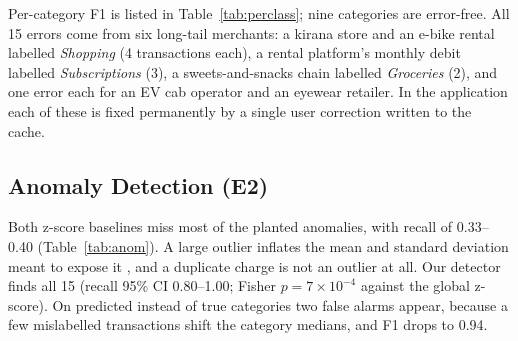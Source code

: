 \documentclass[conference]{IEEEtran}
\begin{document}
\begin{table}[t]
\caption{E1: Transaction categorisation (535 txns, 15 classes)}
\label{tab:cat}
\centering
{}
\end{table}

Per-category F1 is listed in Table~\ref{tab:perclass}; nine categories are error-free. All 15 errors come from six long-tail merchants: a kirana store and an e-bike rental labelled \emph{Shopping} (4 transactions each), a rental platform's monthly debit labelled \emph{Subscriptions} (3), a sweets-and-snacks chain labelled \emph{Groceries} (2), and one error each for an EV cab operator and an eyewear retailer. In the application each of these is fixed permanently by a single user correction written to the cache.

\begin{table}[t]
\caption{Per-category F1 of the hybrid categoriser (support in brackets)}
\label{tab:perclass}
\centering
{}
\end{table}

\subsection{Anomaly Detection (E2)}
Both z-score baselines miss most of the planted anomalies, with recall of 0.33--0.40 (Table~\ref{tab:anom}). A large outlier inflates the mean and standard deviation meant to expose it \cite{iglewicz1993}, and a duplicate charge is not an outlier at all. Our detector finds all 15 (recall 95\% CI 0.80--1.00; Fisher $p=7\times10^{-4}$ against the global z-score). On predicted instead of true categories two false alarms appear, because a few mislabelled transactions shift the category medians, and F1 drops to 0.94.
\end{document}

